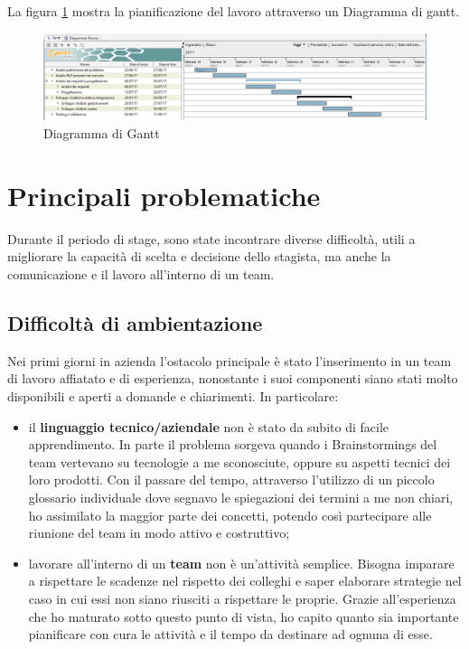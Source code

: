 La figura \ref{gantt} mostra la pianificazione del lavoro attraverso un \gls{Diagramma di gantt}.
\begin{figure}[h]
	\centering
	\includegraphics[scale=0.4]{../Immagini/gantt.png}
	\caption{Diagramma di Gantt}\label{gantt}
\end{figure}

\section{Principali problematiche}
Durante il periodo di stage, sono state incontrare diverse difficoltà, utili a migliorare la capacità di scelta e decisione dello stagista, ma anche la comunicazione e il lavoro all'interno di un team.

\subsection{Difficoltà di ambientazione}
Nei primi giorni in azienda l'ostacolo principale è stato l'inserimento in un team di lavoro affiatato e di esperienza, nonostante i suoi componenti siano stati molto disponibili e aperti a domande e chiarimenti. In particolare:
\begin{itemize}
	\item il \textbf{linguaggio tecnico/aziendale} non è stato da subito di facile apprendimento. In parte il problema sorgeva quando i \glspl{Brainstorming} del team vertevano su tecnologie a me sconosciute, oppure su aspetti tecnici dei loro prodotti. Con il passare del tempo, attraverso l'utilizzo di un piccolo glossario individuale dove segnavo le spiegazioni dei termini a me non chiari, ho assimilato la maggior parte dei concetti, potendo così partecipare alle riunione del team in modo attivo e costruttivo;
	\item lavorare all'interno di un \textbf{team} non è un'attività semplice. Bisogna imparare a rispettare le scadenze nel rispetto dei colleghi e saper elaborare strategie nel caso in cui essi non siano riusciti a rispettare le proprie. Grazie all'esperienza che ho maturato sotto questo punto di vista, ho capito quanto sia importante pianificare con cura le attività e il tempo da destinare ad ognuna di esse.
\end{itemize}

